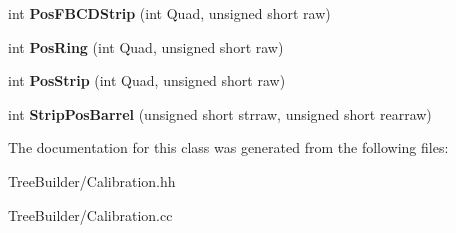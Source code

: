 \begin{DoxyCompactItemize}
\item 
\mbox{\label{class_calibration_a9ee9ef612f7485f5371916bf524bb036}} 
int {\bfseries Pos\+F\+B\+C\+D\+Strip} (int Quad, unsigned short raw)
\item 
\mbox{\label{class_calibration_a240b3ac33e55af3f762d2cecc5d06b2b}} 
int {\bfseries Pos\+Ring} (int Quad, unsigned short raw)
\item 
\mbox{\label{class_calibration_a1d12aea9e2be55852b937e8be3ffbae1}} 
int {\bfseries Pos\+Strip} (int Quad, unsigned short raw)
\item 
\mbox{\label{class_calibration_af2ce93c038cdfd3e9fb1e4ffa093097c}} 
int {\bfseries Strip\+Pos\+Barrel} (unsigned short strraw, unsigned short rearraw)
\end{DoxyCompactItemize}


The documentation for this class was generated from the following files\+:\begin{DoxyCompactItemize}
\item 
Tree\+Builder/Calibration.\+hh\item 
Tree\+Builder/Calibration.\+cc\end{DoxyCompactItemize}
